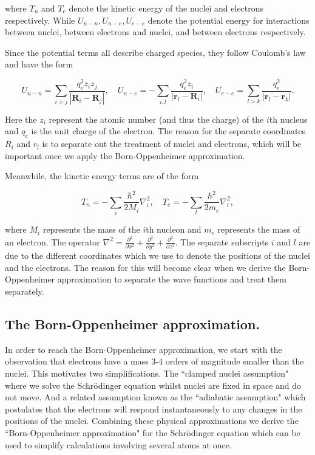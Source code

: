 where $T_n$ and $T_e$ denote the kinetic energy of the nuclei and electrons respectively. While $U_{n-n}, U_{n-e}, U_{e-e}$ denote the potential energy for interactions between nuclei, between electrons and nuclei, and between electrons respectively.

Since the potential terms all describe charged species, they follow Coulomb's law and have the form

\begin{equation}
	U_{n-n} = \sum_{i>j} \frac{q_e^2 z_i z_j }{|\textbf{R}_i-\textbf{R}_j|},\quad U_{n-e} = -\sum_{i,l} \frac{q_e^2 z_i }{|\textbf{r}_l-\textbf{R}_i|},\quad  U_{e-e}  = \sum_{l>k} \frac{q_e^2 }{|\textbf{r}_l-\textbf{r}_k|}.
\end{equation}

Here the $z_i$ represent the atomic number (and thus the charge) of the $i$th nucleus and $q_e$ is the unit charge of the electron. The reason for the separate coordinates $R_i$ and $r_l$ is to separate out the treatment of nuclei and electrons, which will be important once we apply the Born-Oppenheimer approximation.

Meanwhile, the kinetic energy terms are of the form 

\begin {equation}
T_n = - \sum_i \frac{\hbar^2}{2M_i} \nabla_i ^2,\quad  T_e = - \sum_l \frac{\hbar^2}{2m_e} \nabla_l ^2,
\end {equation}

where $M_i$ represents the mass of the $i$th nucleon and $m_e$ represents the mass of an electron. The operator $\nabla^2 = \frac{\partial^2}{\partial x^2} + \frac{\partial^2 }{\partial y^2} + \frac{\partial^2}{\partial z^2} $. The separate subscripts $i$ and $l$ are due to the different coordinates which we use to denote the positions of the nuclei and the electrons. The reason for this will become clear when we derive the Born-Oppenheimer approximation to separate the wave functions and treat them separately.

\subsection{The Born-Oppenheimer approximation.}
\label{born-oppenheimer}
In order to reach the Born-Oppenheimer approximation, we start with the observation that electrons have a mass 3-4 orders of magnitude smaller than the nuclei. This motivates two simplifications. The ``clamped nuclei assumption" where we solve the Schr\"odinger equation whilst nuclei are fixed in space and do not move. And a related assumption known as the ``adiabatic assumption" which postulates that the electrons will respond instantaneously to any changes in the positions of the nuclei. Combining these physical approximations we derive the ``Born-Oppenheimer approximation" for the Schr\"odinger equation which can be used to simplify calculations involving several atoms at once. 

